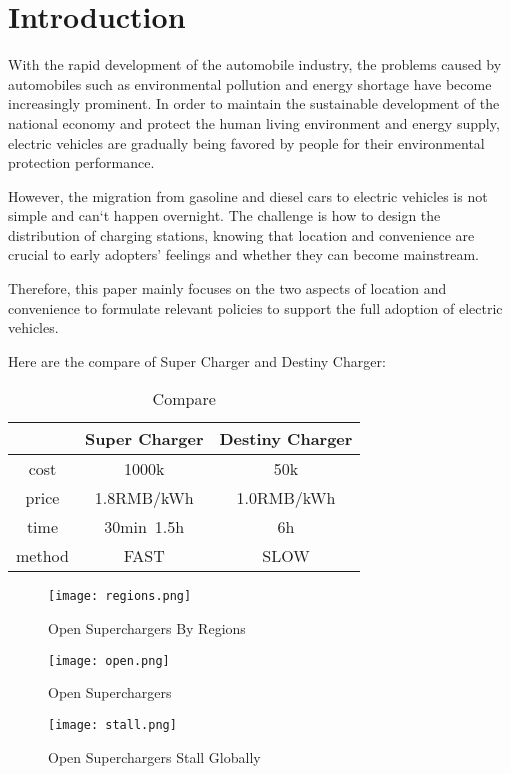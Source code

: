 \documentclass{mcmthesis}
\begin{document}
\section{Introduction}
With the rapid development of the automobile industry, the problems caused by automobiles such as environmental pollution and energy shortage have become increasingly prominent. In order to maintain the sustainable development of the national economy and protect the human living environment and energy supply, electric vehicles are gradually being favored by people for their environmental protection performance.
   
   However, the migration from gasoline and diesel cars to electric vehicles is not simple and can`t happen overnight. The challenge is how to design the distribution of charging stations, knowing that location and convenience are crucial to early adopters' feelings and whether they can become mainstream.
   
   Therefore, this paper mainly focuses on the two aspects of location and convenience to formulate relevant policies to support the full adoption of electric vehicles.

Here are the compare of Super Charger and Destiny Charger:

\begin{table}[!htbp]
\centering
\begin{tabular}{|c|c|c|}
\hline
 &Super Charger&Destiny Charger \\
\hline
cost&1000k&50k\\
\hline
price& 1.8RMB/kWh& 1.0RMB/kWh\\
\hline
time& 30min~1.5h& 6h\\
\hline
method&FAST &SLOW \\
\hline
\end{tabular}
\caption{Compare}
\end{table}

\begin{figure}[htbp]
\small
\centering
\texttt{[image: regions.png]}
\caption{Open Superchargers By Regions} 
\end{figure}


\begin{figure}[htbp]
\small
\centering
\texttt{[image: open.png]}
\caption{Open Superchargers} 
\end{figure}


\begin{figure}[htbp]
\small
\centering
\texttt{[image: stall.png]}
\caption{Open Superchargers Stall Globally} 
\end{figure}
\end{document}
